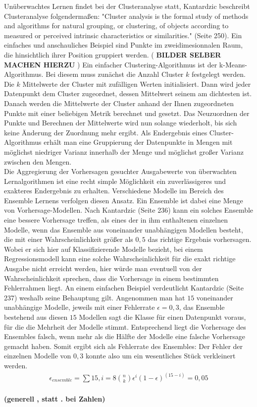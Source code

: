 \documentclass[
	12pt,
	a4paper,
	BCOR10mm,
	DIV14,
	listof=totoc,
	bibliography=totoc,
	headsepline
]{scrreprt}
\begin{document}
Unüberwachtes Lernen findet bei der Clusteranalyse statt, Kantardzic beschreibt Clusteranalyse folgendermaßen: "Cluster analysis is the formal study of methods and algorithms for natural grouping, or clustering, of objects according to measured or perceived intrinsic characteristics or similarities." \cite{kantardzic2011data} (Seite 250). Ein einfaches und anschauliches Beispiel sind Punkte im zweidimesionnalen Raum, die hinsichtlich ihrer Position gruppiert werden. ( \textbf{BILDER SELBER MACHEN HIERZU} )
Ein einfacher Clustering-Algorithmus ist der k-Means-Algorithmus. Bei diesem muss zunächst die Anzahl Cluster $k$ festgelegt werden. Die $k$ Mittelwerte der Cluster mit zufälligen Werten initialisiert. Dann wird jeder Datenpunkt dem Cluster zugeordnet, dessen Mittelwert seinem am dichtesten ist. Danach werden die Mittelwerte der Cluster anhand der Ihnen zugeordneten Punkte mit einer beliebigen Metrik berechnet und gesetzt. Das Neuzuordnen der Punkte und Berechnen der Mittelwerte wird nun solange wiederholt, bis sich keine Änderung der Zuordnung mehr ergibt. Als Endergebnis eines Cluster-Algorithmus erhält man eine Gruppierung der Datenpunkte in Mengen mit möglichst niedriger Varianz innerhalb der Menge und möglichst großer Varianz zwischen den Mengen. \\
Die Aggregierung der Vorhersagen gesuchter Ausgabewerte von überwachten Lernalgorithmen ist eine recht simple Möglichkeit ein zuverlässigeres und exakteres Endergebnis zu erhalten. Verschiedene Modelle im Bereich des Ensemble Lernens verfolgen diesen Ansatz. Ein Ensemble ist dabei eine Menge von Vorhersage-Modellen. Nach Kantardzic \cite{kantardzic2011data} (Seite 236) kann ein solches Ensemble eine bessere Vorhersage treffen, als eines der in ihm enthaltenen einzelnen Modelle, wenn das Ensemble aus voneinander unabhängigen Modellen besteht, die mit einer Wahrscheinlichkeit größer als $0,5$ das richtige Ergebnis vorhersagen. Wobei er sich hier auf Klassifizierende Modelle bezieht, bei einem Regressionsmodell kann eine solche Wahrscheinlichkeit für die exakt richtige Ausgabe nicht erreicht werden, hier würde man eventuell von der Wahrscheinlichkeit sprechen, dass die Vorhersage in einem bestimmten Fehlerrahmen liegt. 
An einem einfachen Beispiel verdeutlicht Kantardzic \cite{kantardzic2011data} (Seite 237) weshalb seine Behauptung gilt. Angenommen man hat $15$ voneinander unabhängige Modelle, jeweils mit einer Fehlerrate $\epsilon = 0,3$, das Ensemble bestehend aus diesen $15$ Modellen sagt die Klasse für einen Datenpunkt voraus, für die die Mehrheit der Modelle stimmt. Entsprechend liegt die Vorhersage des Ensembles falsch, wenn mehr als die Hälfte der Modelle eine falsche Vorhersage gemacht haben. Somit ergibt sich als Fehlerrate des Ensembles: 
Der Fehler der einzelnen Modelle von $0,3$ konnte also um ein wesentliches Stück verkleinert werden.
\begin{align*}
	\epsilon _{ensemble}=\sum{15,i=8}{n\choose k}\epsilon^i(1-\epsilon)^(15-i) = 0,05
\end{align*}
\\
\textbf{(generell , statt . bei Zahlen)}
\end{document}
